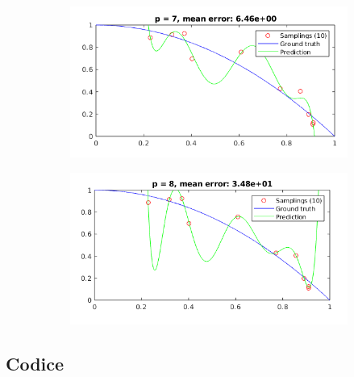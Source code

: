 \documentclass[12pt]{article}
\begin{document}
\begin{figure}[H]
  \centering
  \begin{subfigure}{0.45\textwidth}
    \includegraphics[width=\textwidth]{plots/regression/p_eq_7.png}
  \end{subfigure}
  \begin{subfigure}{0.45\textwidth}
    \includegraphics[width=\textwidth]{plots/regression/p_eq_8.png}
  \end{subfigure}
\end{figure}

\newpage
\subsection{Codice}

\end{document}
